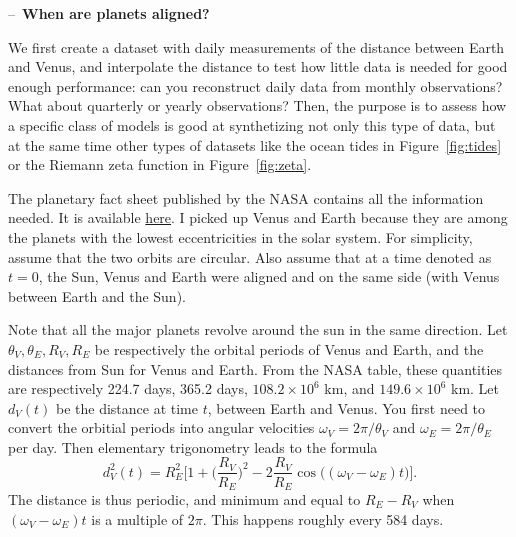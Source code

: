 \documentclass[oneside,10pt]{book}
\begin{document}
\begin{Exercise} -- \,{\bf When are planets aligned?} 

\noindent We first create a dataset with daily measurements of the distance between Earth and Venus, and interpolate the distance to test how little data is needed for good enough performance: can you reconstruct daily data from monthly observations? What about quarterly or yearly observations? Then, the purpose is to assess how a specific class of models is good at synthetizing not only this type of data, but at the same time other types of datasets like the ocean tides in Figure~\ref{fig:tides} or the Riemann zeta function in
 Figure~\ref{fig:zeta}.

The planetary fact sheet published by the NASA contains all the information needed. 
It is available \href{https://nssdc.gsfc.nasa.gov/planetary/factsheet/}{here}. I picked up Venus and Earth because they are among the planets with the lowest eccentricities in the solar system. For simplicity, assume that the two orbits are circular. Also assume that at a time denoted as $t=0$, the Sun, Venus and Earth were aligned and on the same side (with Venus between Earth and the Sun). 

Note that all the major planets revolve around the sun in the same direction. 
Let $\theta_V, \theta_E, R_V, R_E$ be respectively the orbital periods of Venus and Earth, and the  distances from Sun for Venus and Earth.  From the NASA table, these quantities are respectively 224.7 days, 365.2 days, $108.2\times 10^6$ km, and 
$149.6  \times 10^6$ km. Let $d_V(t)$ be the distance at time $t$, between Earth and Venus. You first need to convert the orbitial periods into angular velocities 
 $\omega_V = 2\pi/\theta_V$ and $\omega_E = 2\pi/\theta_E$ per day.  Then elementary trigonometry leads to the formula
\begin{equation}
d_V^2(t) = R_E^2\Bigg[1 + \Big(\frac{R_V}{R_E}\Big)^2 -2\frac{R_V}{R_E} \cos\Big((\omega_V-\omega_E)t\Big) \Bigg]. \label{resw}
\end{equation}
The distance is thus periodic, and minimum and equal to $R_E - R_V$ when  
$(\omega_V-\omega_E)t$ is a multiple of $2\pi$. This happens roughly every 584 days. 




\end{Exercise}
\end{document}
